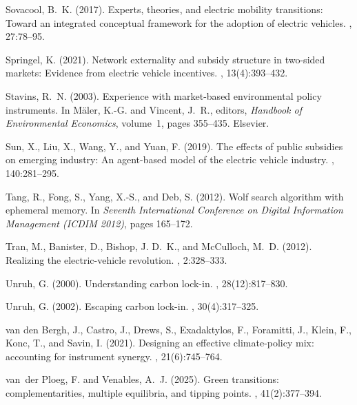 \documentclass[12pt]{article}
\begin{document}
\begin{thebibliography}{}
Sovacool, B.~K. (2017).
\newblock Experts, theories, and electric mobility transitions: Toward an
  integrated conceptual framework for the adoption of electric vehicles.
, 27:78--95.

Springel, K. (2021).
\newblock Network externality and subsidy structure in two-sided markets:
  Evidence from electric vehicle incentives.
, 13(4):393--432.

Stavins, R.~N. (2003).
\newblock Experience with market-based environmental policy instruments.
\newblock In M{\"a}ler, K.-G. and Vincent, J.~R., editors, {\em Handbook of
  Environmental Economics}, volume~1, pages 355--435. Elsevier.

Sun, X., Liu, X., Wang, Y., and Yuan, F. (2019).
\newblock The effects of public subsidies on emerging industry: An agent-based
  model of the electric vehicle industry.
, 140:281--295.

Tang, R., Fong, S., Yang, X.-S., and Deb, S. (2012).
\newblock Wolf search algorithm with ephemeral memory.
\newblock In {\em Seventh International Conference on Digital Information
  Management (ICDIM 2012)}, pages 165--172.

Tran, M., Banister, D., Bishop, J. D.~K., and McCulloch, M.~D. (2012).
\newblock Realizing the electric-vehicle revolution.
, 2:328--333.

Unruh, G. (2000).
\newblock Understanding carbon lock-in.
, 28(12):817--830.

Unruh, G. (2002).
\newblock Escaping carbon lock-in.
, 30(4):317--325.

{van den Bergh}, J., Castro, J., Drews, S., Exadaktylos, F., Foramitti, J.,
  Klein, F., Konc, T., and Savin, I. (2021).
\newblock Designing an effective climate-policy mix: accounting for instrument
  synergy.
, 21(6):745--764.

van~der Ploeg, F. and Venables, A.~J. (2025).
\newblock Green transitions: complementarities, multiple equilibria, and
  tipping points.
, 41(2):377--394.


\end{thebibliography}
\end{document}
